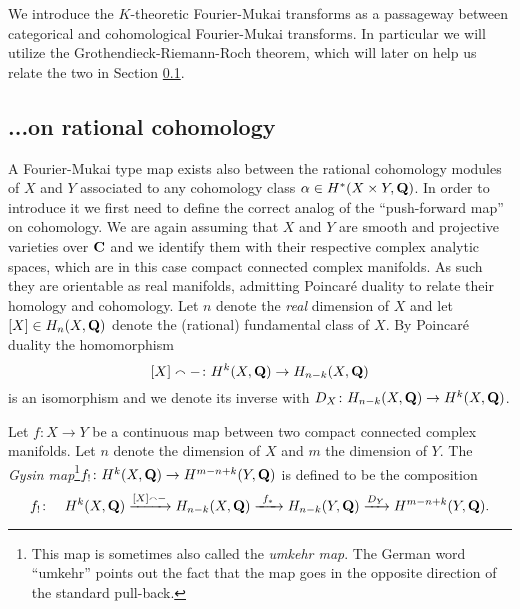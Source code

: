 We introduce the $K$-theoretic Fourier-Mukai transforms as a passageway between categorical and cohomological Fourier-Mukai transforms. In particular we will utilize the Grothendieck-Riemann-Roch theorem, which will later on help us relate the two in Section \ref{Subsection: FM transform on cohomology}.



\subsection{...on rational cohomology}
\label{Subsection: FM transform on cohomology}

A Fourier-Mukai type map exists also between the rational cohomology modules of $X$ and $Y$ associated to any cohomology class $\alpha \in H^{*}(X \times Y, \mathbf Q)$. In order to introduce it we first need to define the correct analog of the ``push-forward map'' on cohomology. We are again assuming that $X$ and $Y$ are smooth and projective varieties over $\mathbf C$ and we identify them with their respective complex analytic spaces, which are in this case compact connected complex manifolds. As such they are orientable as real manifolds, admitting Poincaré duality to relate their homology and cohomology. Let $n$ denote the \emph{real} dimension of $X$ and let $[X] \in H_n(X, \mathbf Q)$ denote the (rational) fundamental class of $X$. By Poincaré duality \cite[\S VI, Theorem 8.3]{Bredon1993} the homomorphism
\[
    [X] \smallfrown - \colon H^{k}(X, \mathbf Q) \to H_{n-k}(X, \mathbf Q)
\]
is an isomorphism and we denote its inverse with $D_X \colon H_{n-k}(X, \mathbf Q) \to H^{k}(X, \mathbf Q)$.

\begin{definition}
    Let $f \colon X \to Y$ be a continuous map between two compact connected complex manifolds. Let $n$ denote the dimension of $X$ and $m$ the dimension of $Y$.
    The \emph{Gysin map}\footnote{This map is sometimes also called the \emph{umkehr map}. The German word ``umkehr'' points out the fact that the map goes in the opposite direction of the standard pull-back.}$f_! \colon H^{k}(X, \mathbf Q) \to H^{m-n+k}(Y, \mathbf Q)$ is defined to be the composition
    \[
        f_! \colon \quad H^{k}(X, \mathbf Q) \xrightarrow{[X] \smallfrown -} H_{n-k}(X, \mathbf Q) \xrightarrow{\ f_* \ } H_{n-k}(Y, \mathbf Q) \xrightarrow{D_Y} H^{m-n+k}(Y, \mathbf Q).
    \]
\end{definition}


